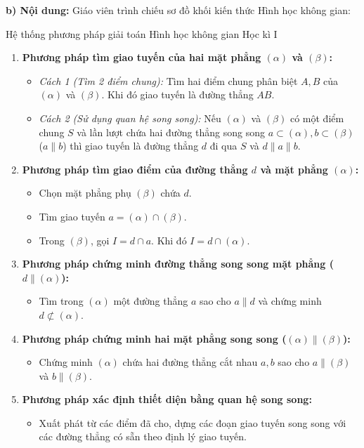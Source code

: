 \documentclass[12pt, a4paper]{article}
\begin{document}
\noindent \textbf{b) Nội dung:}
Giáo viên trình chiếu sơ đồ khối kiến thức Hình học không gian:

\begin{pedabox}{Hệ thống phương pháp giải toán Hình học không gian Học kì I}
    \begin{enumerate}
        \item \textbf{Phương pháp tìm giao tuyến của hai mặt phẳng $(\alpha)$ và $(\beta)$:}
        \begin{itemize}
            \item \textit{Cách 1 (Tìm 2 điểm chung):} Tìm hai điểm chung phân biệt $A, B$ của $(\alpha)$ và $(\beta)$. Khi đó giao tuyến là đường thẳng $AB$.
            \item \textit{Cách 2 (Sử dụng quan hệ song song):} Nếu $(\alpha)$ và $(\beta)$ có một điểm chung $S$ và lần lượt chứa hai đường thẳng song song $a \subset (\alpha), b \subset (\beta)$ ($a \parallel b$) thì giao tuyến là đường thẳng $d$ đi qua $S$ và $d \parallel a \parallel b$.
        \end{itemize}

        \item \textbf{Phương pháp tìm giao điểm của đường thẳng $d$ và mặt phẳng $(\alpha)$:}
        \begin{itemize}
            \item Chọn mặt phẳng phụ $(\beta)$ chứa $d$.
            \item Tìm giao tuyến $a = (\alpha) \cap (\beta)$.
            \item Trong $(\beta)$, gọi $I = d \cap a$. Khi đó $I = d \cap (\alpha)$.
        \end{itemize}

        \item \textbf{Phương pháp chứng minh đường thẳng song song mặt phẳng ($d \parallel (\alpha)$):}
        \begin{itemize}
            \item Tìm trong $(\alpha)$ một đường thẳng $a$ sao cho $a \parallel d$ và chứng minh $d \not\subset (\alpha)$.
        \end{itemize}

        \item \textbf{Phương pháp chứng minh hai mặt phẳng song song ($(\alpha) \parallel (\beta)$):}
        \begin{itemize}
            \item Chứng minh $(\alpha)$ chứa hai đường thẳng cắt nhau $a, b$ sao cho $a \parallel (\beta)$ và $b \parallel (\beta)$.
        \end{itemize}

        \item \textbf{Phương pháp xác định thiết diện bằng quan hệ song song:}
        \begin{itemize}
            \item Xuất phát từ các điểm đã cho, dựng các đoạn giao tuyến song song với các đường thẳng có sẵn theo định lý giao tuyến.
        \end{itemize}
    \end{enumerate}
\end{pedabox}
\end{document}
